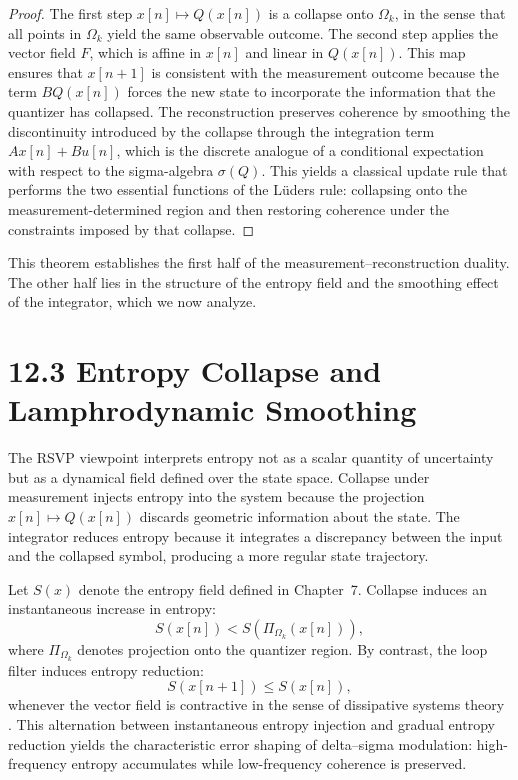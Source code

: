 \begin{proof}
The first step $x[n] \mapsto Q(x[n])$ is a collapse onto $\Omega_{k}$, in the sense that all points in $\Omega_{k}$ yield the same observable outcome. The second step applies the vector field $F$, which is affine in $x[n]$ and linear in $Q(x[n])$. This map ensures that $x[n+1]$ is consistent with the measurement outcome because the term $B Q(x[n])$ forces the new state to incorporate the information that the quantizer has collapsed. The reconstruction preserves coherence by smoothing the discontinuity introduced by the collapse through the integration term $A x[n] + B u[n]$, which is the discrete analogue of a conditional expectation with respect to the sigma-algebra $\sigma(Q)$. This yields a classical update rule that performs the two essential functions of the Lüders rule: collapsing onto the measurement-determined region and then restoring coherence under the constraints imposed by that collapse.
\end{proof}

This theorem establishes the first half of the measurement--reconstruction duality. The other half lies in the structure of the entropy field and the smoothing effect of the integrator, which we now analyze.

\section*{12.3 Entropy Collapse and Lamphrodynamic Smoothing}

The RSVP viewpoint interprets entropy not as a scalar quantity of uncertainty but as a dynamical field defined over the state space. Collapse under measurement injects entropy into the system because the projection $x[n] \mapsto Q(x[n])$ discards geometric information about the state. The integrator reduces entropy because it integrates a discrepancy between the input and the collapsed symbol, producing a more regular state trajectory.

Let $S(x)$ denote the entropy field defined in Chapter~7. Collapse induces an instantaneous increase in entropy:
\[
S(x[n]) < S\!\left(\Pi_{\Omega_{k}}(x[n])\right),
\]
where $\Pi_{\Omega_{k}}$ denotes projection onto the quantizer region. By contrast, the loop filter induces entropy reduction:
\[
S(x[n+1]) \leq S(x[n]),
\]
whenever the vector field is contractive in the sense of dissipative systems theory \cite{willems1972dissipative, khalil2002nonlinear}. This alternation between instantaneous entropy injection and gradual entropy reduction yields the characteristic error shaping of delta--sigma modulation: high-frequency entropy accumulates while low-frequency coherence is preserved.


